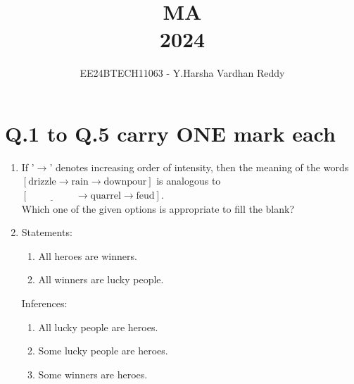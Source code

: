 \documentclass[journal]{IEEEtran}
\renewcommand{\thefigure}{\theenumi}
\renewcommand{\thetable}{\theenumi}
\numberwithin{equation}{enumi}
\numberwithin{figure}{enumi}
\renewcommand{\thetable}{\theenumi}
\begin{document}

\vspace{3cm}

\title{MA\\2024}
\author{EE24BTECH11063 - Y.Harsha Vardhan Reddy}
\maketitle

\bigskip

\renewcommand{\thefigure}{\theenumi}
\renewcommand{\thetable}{\theenumi}

\section*{Q.1 to Q.5 carry ONE mark each}
\begin{enumerate}
\item
If '$\rightarrow$' denotes increasing order of intensity, then the meaning of the words \\
$[ \text{drizzle} \rightarrow \text{rain} \rightarrow \text{downpour} ]$ is analogous to $[ \underline{\hspace{2cm}} \rightarrow \text{quarrel} \rightarrow \text{feud} ]$. \\
Which one of the given options is appropriate to fill the blank?




\begin{enumerate}
\end{enumerate}

\bigskip

\item Statements: 
\begin{enumerate}[label=\arabic*.]
    \item All heroes are winners.
    \item All winners are lucky people.
\end{enumerate}

Inferences:
\begin{enumerate}[label=\Roman*.]
    \item All lucky people are heroes.
    \item Some lucky people are heroes.
    \item Some winners are heroes.
\end{enumerate}


\end{enumerate}
\end{document}
